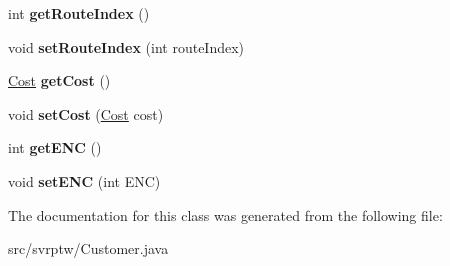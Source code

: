 \begin{DoxyCompactItemize}
\item 
int {\bfseries get\+Route\+Index} ()\hypertarget{classsvrptw_1_1_customer_a5b9b3d2ca07f3b6d75e16467c94dcf07}{}\label{classsvrptw_1_1_customer_a5b9b3d2ca07f3b6d75e16467c94dcf07}

\item 
void {\bfseries set\+Route\+Index} (int route\+Index)\hypertarget{classsvrptw_1_1_customer_a68b28d11944f01c263c1783693a71fa2}{}\label{classsvrptw_1_1_customer_a68b28d11944f01c263c1783693a71fa2}

\item 
\hyperlink{classsvrptw_1_1_cost}{Cost} {\bfseries get\+Cost} ()\hypertarget{classsvrptw_1_1_customer_a53a8716939b28a168b810fb132ffba98}{}\label{classsvrptw_1_1_customer_a53a8716939b28a168b810fb132ffba98}

\item 
void {\bfseries set\+Cost} (\hyperlink{classsvrptw_1_1_cost}{Cost} cost)\hypertarget{classsvrptw_1_1_customer_af30684135b6287b5745dc6ec82bc2355}{}\label{classsvrptw_1_1_customer_af30684135b6287b5745dc6ec82bc2355}

\item 
int {\bfseries get\+E\+NC} ()\hypertarget{classsvrptw_1_1_customer_a0b0483cee0188abf29c1b8ef26f85b88}{}\label{classsvrptw_1_1_customer_a0b0483cee0188abf29c1b8ef26f85b88}

\item 
void {\bfseries set\+E\+NC} (int E\+NC)\hypertarget{classsvrptw_1_1_customer_a91db372c73e932fdd81dfa9452ea9fdd}{}\label{classsvrptw_1_1_customer_a91db372c73e932fdd81dfa9452ea9fdd}

\end{DoxyCompactItemize}


The documentation for this class was generated from the following file\+:\begin{DoxyCompactItemize}
\item 
src/svrptw/Customer.\+java\end{DoxyCompactItemize}
